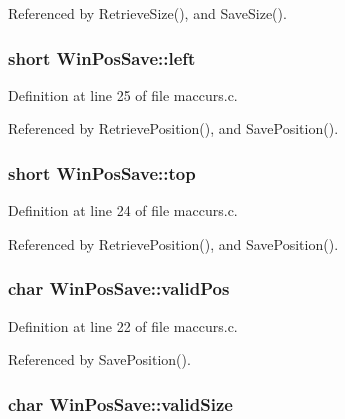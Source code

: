 Referenced by Retrieve\+Size(), and Save\+Size().

\hypertarget{structWinPosSave_a02f324c04a83153db807c1732244b79e}{
\subsubsection[{left}]{\setlength{\rightskip}{0pt plus 5cm}short Win\+Pos\+Save\+::left}}\label{structWinPosSave_a02f324c04a83153db807c1732244b79e}


Definition at line 25 of file maccurs.\+c.



Referenced by Retrieve\+Position(), and Save\+Position().

\hypertarget{structWinPosSave_ac35101a83baaa8d1d95401080e1ae44c}{
\subsubsection[{top}]{\setlength{\rightskip}{0pt plus 5cm}short Win\+Pos\+Save\+::top}}\label{structWinPosSave_ac35101a83baaa8d1d95401080e1ae44c}


Definition at line 24 of file maccurs.\+c.



Referenced by Retrieve\+Position(), and Save\+Position().

\hypertarget{structWinPosSave_af75cf20f7e9b3652c92a71144aa5f04b}{
\subsubsection[{valid\+Pos}]{\setlength{\rightskip}{0pt plus 5cm}char Win\+Pos\+Save\+::valid\+Pos}}\label{structWinPosSave_af75cf20f7e9b3652c92a71144aa5f04b}


Definition at line 22 of file maccurs.\+c.



Referenced by Save\+Position().

\hypertarget{structWinPosSave_ad3e75df1e54e30579612f2d446cc4fa7}{
\subsubsection[{valid\+Size}]{\setlength{\rightskip}{0pt plus 5cm}char Win\+Pos\+Save\+::valid\+Size}}\label{structWinPosSave_ad3e75df1e54e30579612f2d446cc4fa7}


